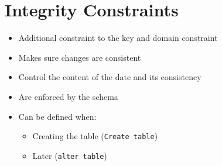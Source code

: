 
\section{Integrity Constraints}
\begin{itemize}
    \item Additional constraint to the key and domain constraint
    \item Makes sure changes are consistent
    \item Control the content of the date and its consistency
    \item Are enforced by the schema
    \item Can be defined when:
        \begin{itemize}
            \item Creating the table (\verb+Create table+)
            \item Later (\verb+alter table+)
        \end{itemize}
\end{itemize}

